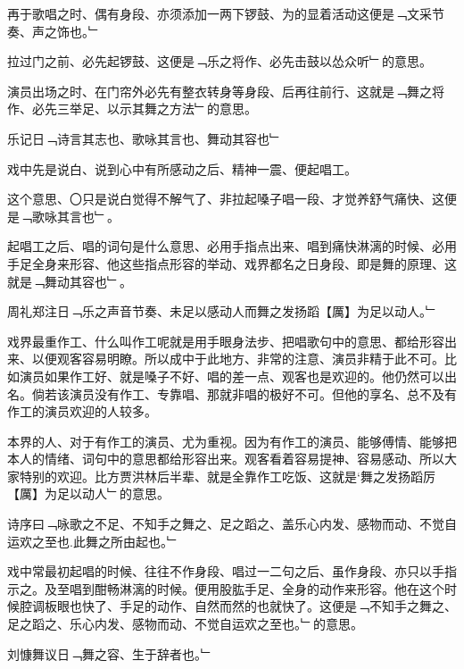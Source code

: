 再于歌唱之时、偶有身段、亦须添加一两下锣鼓、为的显着活动这便是﹁文采节奏、声之饰也。﹂

拉过门之前、必先起锣鼓、这便是﹁乐之将作、必先击鼓以怂众听﹂的意思。

演员出场之时、在门帘外必先有整衣转身等身段、后再往前行、这就是﹁舞之将作、必先三举足、以示其舞之方法﹂的意思。

\begin{preface}
  乐记日﹁诗言其志也、歌咏其言也、舞动其容也﹂
\end{preface}

戏中先是说白、说到心中有所感动之后、精神一震、便起唱工。

这个意思、〇只是说白觉得不解气了、非拉起嗓子唱一段、才觉养舒气痛快、这便是﹁歌咏其言也﹂。

起唱工之后、唱的词句是什么意思、必用手指点出来、唱到痛快淋漓的时候、必用手足全身来形容、他这些指点形容的举动、戏界都名之日身段、即是舞的原理、这就是﹁舞动其容也﹂。

\begin{preface}
  周礼郑注日﹁乐之声音节奏、未足以感动人而舞之发扬蹈【厲】为足以动人。﹂
\end{preface}

戏界最重作工、什么叫作工呢就是用手眼身法步、把唱歌句中的意思、都给形容出来、以便观客容易明瞭。所以成中于此地方、非常的注意、演员非精于此不可。比如演员如果作工好、就是嗓子不好、唱的差一点、观客也是欢迎的。他仍然可以出名。倘若该演员没有作工、专靠唱、那就非唱的极好不可。但他的享名、总不及有作工的演员欢迎的人较多。

本界的人、对于有作工的演员、尤为重视。因为有作工的演员、能够傅情、能够把本人的情绪、词句中的意思都给形容出来。观客看着容易提神、容易感动、所以大家特别的欢迎。比方贾洪林后半辈、就是全靠作工吃饭、这就是‘舞之发扬蹈厉【厲】为足以动人﹂的意思。

\begin{preface}
  诗序曰﹁咏歌之不足、不知手之舞之、足之蹈之、盖乐心内发、感物而动、不觉自运欢之至也.此舞之所由起也。﹂
\end{preface}

戏中常最初起唱的时候、往往不作身段、唱过一二句之后、虽作身段、亦只以手指示之。及至唱到酣畅淋漓的时候。便用股肱手足、全身的动作来形容。他在这个时候腔调板眼也快了、手足的动作、自然而然的也就快了。这便是﹁不知手之舞之、足之蹈之、乐心内发、感物而动、不觉自运欢之至也。﹂的意思。

\begin{preface}
  刘慷舞议日﹁舞之容、生于辞者也。﹂
\end{preface}

